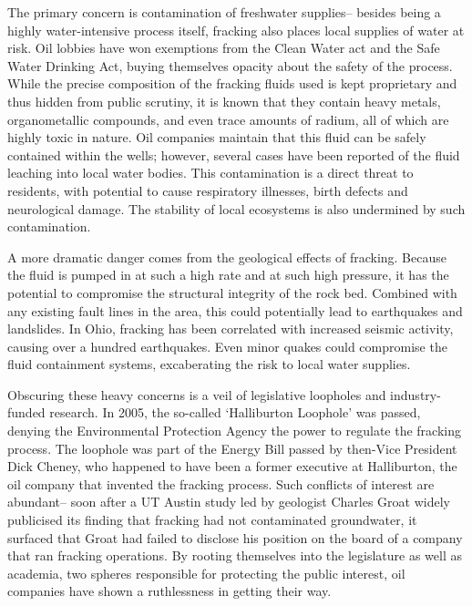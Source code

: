 \documentclass[12pt,letterpaper]{article}
\begin{document}
The primary concern is contamination of freshwater supplies-- besides being a highly water-intensive process itself, fracking also places local supplies of water at risk. Oil lobbies have won exemptions from the Clean Water act and the Safe Water Drinking Act, buying themselves opacity about the safety of the process. While the precise composition of the fracking fluids used is kept proprietary and thus hidden from public scrutiny, it is known that they contain heavy metals, organometallic compounds, and even trace amounts of radium, all of which are highly toxic in nature. Oil companies maintain that this fluid can be safely contained within the wells; however, several cases have been reported of the fluid leaching into local water bodies. This contamination is a direct threat to residents, with potential to cause respiratory illnesses, birth defects and neurological damage. The stability of local ecosystems is also undermined by such contamination. 

A more dramatic danger comes from the geological effects of fracking. Because the fluid is pumped in at such a high rate and at such high pressure, it has the potential to compromise the structural integrity of the rock bed. Combined with any existing fault lines in the area, this could potentially lead to earthquakes and landslides. In Ohio, fracking has been correlated with increased seismic activity, causing over a hundred earthquakes. Even minor quakes could compromise the fluid containment systems, excaberating the risk to local water supplies.

Obscuring these heavy concerns is a veil of legislative loopholes and industry-funded research. In 2005, the so-called `Halliburton Loophole' was passed, denying the Environmental Protection Agency the power to regulate the fracking process. The loophole was part of the Energy Bill passed by then-Vice President Dick Cheney, who happened to have been a former executive at Halliburton, the oil company that invented the fracking process. Such conflicts of interest are abundant-- soon after a UT Austin study led by geologist Charles Groat widely publicised its finding that fracking had not contaminated groundwater, it surfaced that Groat had failed to disclose his position on the board of a company that ran fracking operations. By rooting themselves into the legislature as well as academia, two spheres responsible for protecting the public interest, oil companies have shown a ruthlessness in getting their way.

\makeworkscited
\end{document}
